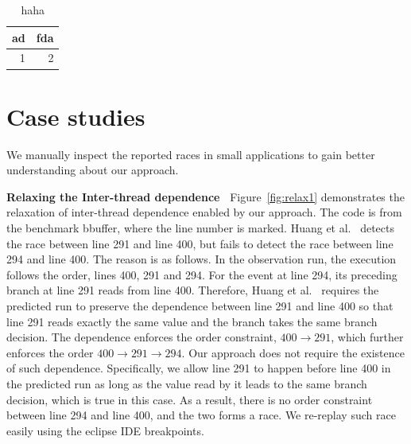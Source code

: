   


\begin{table}[htbp]
\caption{haha}
\begin{tabular}{|l|l|}
\hline
ad & fda \\ \hline
\multicolumn{1}{|r|}{1} & \multicolumn{1}{r|}{2} \\ \hline
\end{tabular}
\label{tb:ref}
\end{table}


\section{Case studies}
We manually inspect the reported races in small applications to gain better understanding about our approach. 

{\bf Relaxing the Inter-thread dependence\ } Figure~\ref{fig:relax1} demonstrates the relaxation of inter-thread dependence enabled by our approach. 
The code is from the benchmark {\sf bbuffer}, where the line number is marked. Huang et al.~\cite{} detects the race between line 291 and line 400, but fails to detect the race between line 294 and line 400. The reason is as follows. In the observation run, the execution follows the order,  lines 400, 291 and 294. For the event at line 294, its preceding branch at line 291 reads from line 400. Therefore, Huang et al.~\cite{}
 requires the predicted run to preserve the dependence between line 291 and line 400 so that line 291 reads exactly the same value and the branch takes the same branch decision. The dependence enforces the order constraint, $400 \rightarrow 291$, which further enforces the order $400\rightarrow 291 \rightarrow 294$.    Our approach does not require the existence of such dependence. Specifically, we allow line 291 to happen before line 400 in the predicted run as long as the value read by it leads to the same branch decision, which is true in this case.  As a result, there is no order constraint between line 294 and line 400, and the two forms a race. We re-replay such race  easily using the eclipse IDE breakpoints. 


 

